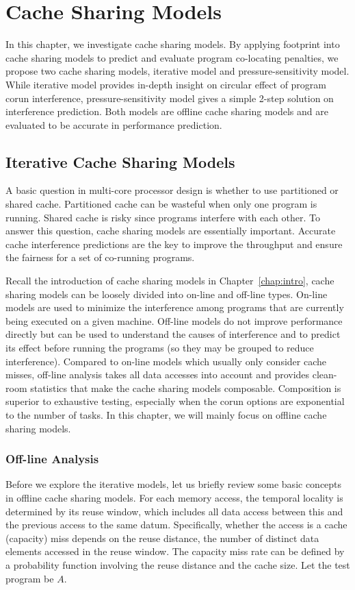\chapter{Cache Sharing Models}
\label{chap:corun}

In this chapter, we investigate cache sharing models. By applying
footprint into cache sharing models to predict and evaluate program
co-locating penalties, we propose two cache sharing models, iterative
model and pressure-sensitivity model. While iterative model provides
in-depth insight on circular effect of program corun interference,
pressure-sensitivity model gives a simple 2-step solution on
interference prediction. Both models are offline cache sharing models
and are evaluated to be accurate in performance prediction. 

\section{Iterative Cache Sharing Models}
\label{sec:iter-model}
A basic question in multi-core processor design is whether to use
partitioned or shared cache.  Partitioned cache can be wasteful when
only one program is running.  Shared cache is risky since programs
interfere with each other. To answer this question, cache sharing
models are essentially important. Accurate cache interference
predictions are the key to improve the throughput and ensure the
fairness for a set of co-running programs. 

Recall the introduction of cache sharing models in
Chapter~\ref{chap:intro}, cache sharing models can be loosely divided
into on-line and off-line types.  On-line models are used to minimize
the interference among programs that are currently being executed on a
given machine.  Off-line models do not improve performance directly
but can be used to understand the causes of interference and to
predict its effect before running the programs (so they may be grouped
to reduce interference). Compared to on-line models which usually only
consider cache misses, off-line analysis takes all data accesses into
account and provides clean-room statistics that make the cache sharing
models composable. Composition is superior to exhaustive testing,
especially when the corun options are exponential to the number of
tasks. In this chapter, we will mainly focus on offline cache sharing
models. 

\subsection{Off-line Analysis}
Before we explore the iterative models, let us briefly review some
basic concepts in offline cache sharing models.   
For each memory access, the temporal locality is determined by its
reuse window, which includes all data access between this and the
previous access to the same datum.   Specifically, whether the access
is a cache (capacity) miss depends on the reuse distance, the number
of distinct data elements accessed in the reuse window. 
The capacity miss rate can be defined by a probability function
involving the reuse distance and the cache size.  Let the test program
be $A$. 

